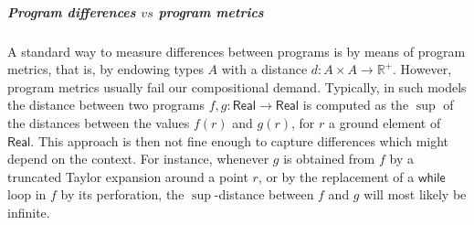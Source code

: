%
%
%
%
%
%
%
%
%
%
%
%
%
%


\subparagraph*{Program differences $vs$ program metrics}



A standard way to measure differences between programs is by means of program metrics, that is, by endowing types $A$ with a distance $d:A\times A\to \mathbb R^{+}$. However, program metrics usually fail our compositional demand. Typically, in such models the distance between two programs $f,g: \mathsf{Real}\to \mathsf{Real}$ is computed as the $\sup$ of the distances between the values $f(r)$ and $g(r)$, for $r$ a ground element of $\mathsf{Real}$. 
This approach is then not fine enough to capture differences which might depend on the context. For instance, whenever $g$ is obtained from $f$ by a truncated Taylor expansion around a point $r$, or by the replacement of a  $\mathsf{while}$ loop in $f$ by its perforation, the $\sup$-distance between $f$ and $g$ will most likely be infinite.


